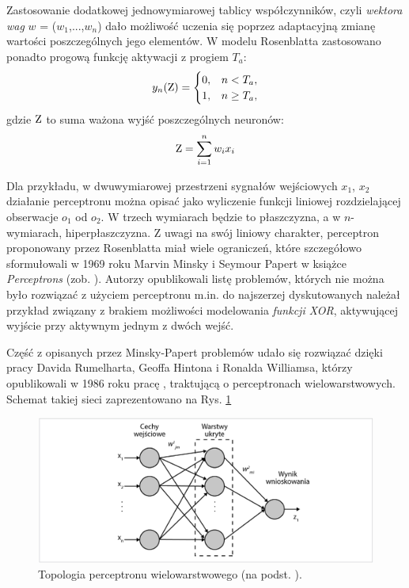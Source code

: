 Zastosowanie dodatkowej jednowymiarowej tablicy współczynników, czyli \textit{wektora wag} $w$ = ($w_1$,...,$w_n$) dało możliwość uczenia się poprzez adaptacyjną zmianę wartości poszczególnych jego elementów. W modelu Rosenblatta zastosowano ponadto progową funkcję aktywacji z progiem $T_a$:
\begin{equation}
y_n(\mathrm{Z})=\begin{cases} 0, & n < T_a, \\ 1, & n \ge T_a, \end{cases}
\end{equation}
gdzie $\mathrm{Z}$ to suma ważona wyjść poszczególnych neuronów:
\begin{equation}
\label{eqLinActFunc}
\mathrm{Z}=\sum_{i=1}^{n}w_i x_i
\end{equation}

Dla przykładu, w dwuwymiarowej przestrzeni sygnałów wejściowych {$x_1$, $x_2$}  działanie perceptronu można opisać jako wyliczenie funkcji liniowej rozdzielającej obserwacje $o_1$ od $o_2$. W trzech wymiarach będzie to płaszczyzna, a w $n$-wymiarach, hiperpłaszczyzna. Z uwagi na swój liniowy charakter, perceptron proponowany przez Rosenblatta miał wiele ograniczeń, które szczegółowo sformułowali w 1969 roku Marvin Minsky i Seymour Papert w książce \textit{Perceptrons} (zob. \cite{Minsky1969}). Autorzy opublikowali listę problemów, których nie można było rozwiązać z użyciem perceptronu m.in. do najszerzej dyskutowanych należał przykład związany z brakiem możliwości modelowania \textit{funkcji XOR}, aktywującej wyjście przy aktywnym jednym z dwóch wejść.

Część z opisanych przez Minsky-Papert problemów udało się rozwiązać dzięki pracy Davida Rumelharta, Geoffa Hintona i Ronalda Williamsa, którzy opublikowali w 1986 roku pracę \cite{Rumelhart1986}, traktującą o perceptronach wielowarstwowych. Schemat takiej sieci zaprezentowano na Rys. \ref{MLperceptron}
\begin{figure}[h!]
	\centering
	\includegraphics[width=1\textwidth]{figures/MLperceptron.png}
	\caption{Topologia perceptronu wielowarstwowego (na podst. \cite{Rumelhart1986}).}
	\label{MLperceptron}
\end{figure}

